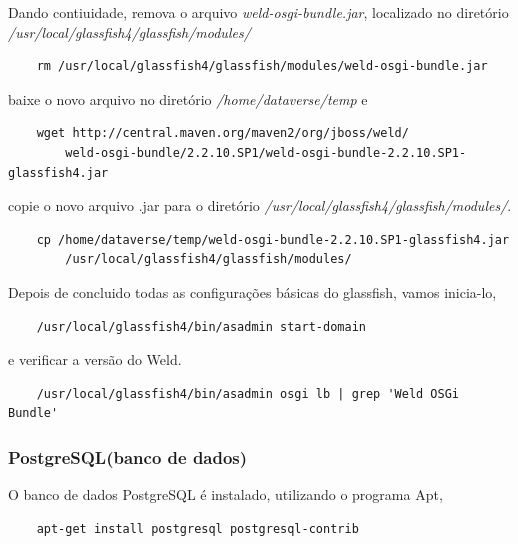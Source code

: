 \documentclass[12pt,hidelinks]{article}
\begin{document}
        Dando contiuidade, remova o arquivo \textit{weld-osgi-bundle.jar}, localizado no diretório \textit{/usr/local/glassfish4/glassfish/modules/}
        \begin{verbatim}
    rm /usr/local/glassfish4/glassfish/modules/weld-osgi-bundle.jar
        \end{verbatim}
        baixe o novo arquivo no diretório \textit{/home/dataverse/temp} e 
        \begin{verbatim}
    wget http://central.maven.org/maven2/org/jboss/weld/
        weld-osgi-bundle/2.2.10.SP1/weld-osgi-bundle-2.2.10.SP1-glassfish4.jar
        \end{verbatim}
        copie o novo arquivo .jar para o diretório \textit{/usr/local/glassfish4/glassfish/modules/}. 
        \begin{verbatim}
    cp /home/dataverse/temp/weld-osgi-bundle-2.2.10.SP1-glassfish4.jar 
        /usr/local/glassfish4/glassfish/modules/
        \end{verbatim}
        
        Depois de concluido todas as configurações básicas do glassfish, vamos inicia-lo,    
        \begin{verbatim} 
    /usr/local/glassfish4/bin/asadmin start-domain
        \end{verbatim}
        e verificar a versão do Weld.
        \begin{verbatim} 
    /usr/local/glassfish4/bin/asadmin osgi lb | grep 'Weld OSGi Bundle'
        \end{verbatim}
        
        
        \subsubsection{PostgreSQL(banco de dados)}
        
        O banco de dados PostgreSQL é instalado, utilizando o programa Apt, 
        \begin{verbatim} 
    apt-get install postgresql postgresql-contrib
        \end{verbatim}
        
\end{document}
